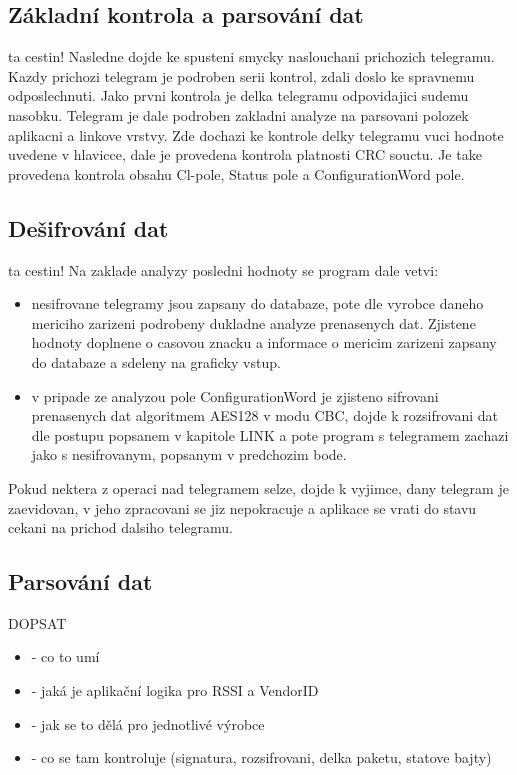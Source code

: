 \subsection{Základní kontrola a parsování dat}
\colorbox[rgb]{1,0,0}{ta cestin!}
Nasledne dojde ke spusteni smycky naslouchani prichozich telegramu. Kazdy prichozi telegram je podroben serii kontrol, zdali doslo ke spravnemu odposlechnuti. Jako prvni kontrola je delka telegramu odpovidajici sudemu nasobku. Telegram je dale podroben zakladni analyze na parsovani polozek aplikacni a linkove vrstvy. Zde dochazi ke kontrole delky telegramu vuci hodnote uvedene v hlavicce, dale je provedena kontrola platnosti CRC souctu. Je take provedena kontrola obsahu Cl-pole, Status pole a ConfigurationWord pole.

\subsection{Dešifrování dat}
\colorbox[rgb]{1,0,0}{ta cestin!}
 Na zaklade analyzy posledni hodnoty se program dale vetvi:
\begin{itemize}
	\item nesifrovane telegramy jsou zapsany do databaze, pote dle vyrobce daneho mericiho zarizeni podrobeny dukladne analyze prenasenych dat. Zjistene hodnoty doplnene o casovou znacku a informace o mericim zarizeni zapsany do databaze a sdeleny na graficky vstup.
	\item v pripade ze analyzou pole ConfigurationWord je zjisteno sifrovani prenasenych dat algoritmem AES128 v modu CBC, dojde k rozsifrovani dat dle postupu popsanem v kapitole \colorbox[rgb]{0,0,0}{LINK} a pote program s telegramem zachazi jako s nesifrovanym, popsanym v predchozim bode.
\end{itemize}
Pokud nektera z operaci nad telegramem selze, dojde k vyjimce, dany telegram je zaevidovan, v jeho zpracovani se jiz nepokracuje a aplikace se vrati do stavu cekani na prichod dalsiho telegramu.

\subsection{Parsování dat}
\colorbox[rgb]{1,0,0}{DOPSAT}
\begin{itemize}
\item - co to umí
\item - jaká je aplikační logika pro RSSI a VendorID
\item - jak se to dělá pro jednotlivé výrobce
\item - co se tam kontroluje (signatura, rozsifrovani, delka paketu, statove bajty)
\end{itemize}

